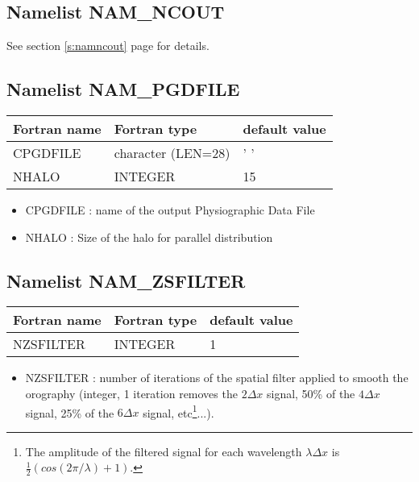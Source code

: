 \subsection{Namelist NAM\_NCOUT}
See section \ref{s:namncout} page \pageref{s:namncout} for details.


\subsection{Namelist NAM\_PGDFILE}

\begin{center}
\begin{tabular} {|l|l|l|}
\hline
Fortran name & Fortran type & default value\\
\hline
\hline
CPGDFILE      & character (LEN=28) & ' '           \\
NHALO         & INTEGER      & 15 \\
\hline
\end{tabular}
\end{center}

\begin{itemize}
\item CPGDFILE : name of the output Physiographic Data File
\item NHALO :  Size of the halo for parallel distribution

\end{itemize}
\subsection{Namelist NAM\_ZSFILTER}

\begin{center}
\begin{tabular} {|l|l|l|}
\hline
Fortran name & Fortran type & default value\\
\hline
\hline
NZSFILTER       & INTEGER      & 1 \\
\hline
\end{tabular}
\end{center}

\begin{itemize}
\item NZSFILTER : number of iterations of the spatial filter applied to smooth the orography (integer, 1 iteration removes the $2\Delta x$ signal, 50\% of the $4\Delta x$
signal, 25\% of the $6\Delta x$ signal, etc\footnote{The amplitude of the
filtered signal for each wavelength $\lambda\Delta x$ 
is $\frac{1}{2}\left( cos(2\pi/\lambda) +1\right)$.}...).
\end{itemize}
